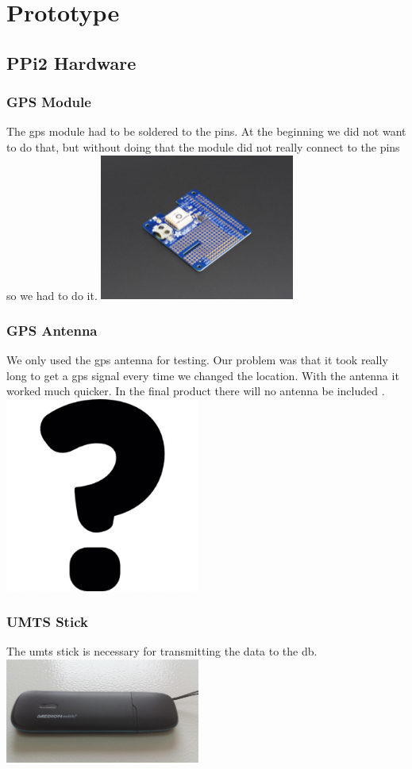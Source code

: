 \chapter{Prototype}
\section{PPi2 Hardware}
\subsection{GPS Module}
    
The \gls{gps} module had to be soldered to the pins. At the beginning we did not want to do that, but without doing that the module did not really connect to the pins so we had to do it.\newline
\includegraphics[width=0.48\textwidth]{bilder/GPS}
\subsection{GPS Antenna}
We only used the \gls{gps} antenna for testing. Our problem was that it took really long to get a \gls{gps} signal every time we changed the location. With the antenna it worked much quicker. In the final product there will no antenna be included .\newline 
\includegraphics[width=0.48\textwidth]{bilder/Antenna}
\subsection{UMTS Stick}
The \gls{umts} stick is necessary for transmitting the data to the \gls{db}.\newline
\includegraphics[width=0.48\textwidth]{bilder/Medion_3}
